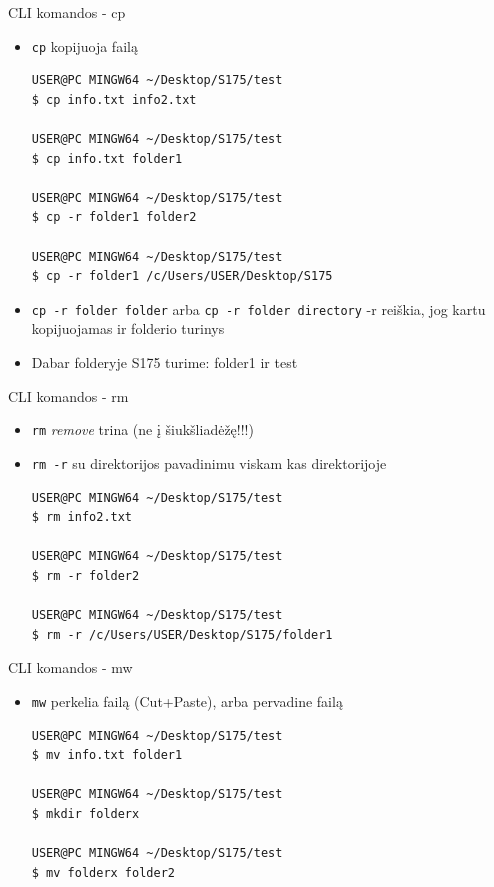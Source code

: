 \documentclass[11pt,xcolor=table]{beamer}
\begin{document}
\begin{frame}[fragile]{CLI komandos - cp}
\begin{itemize}
\item \colorbox{listinggray}{\lstinline|cp|}  kopijuoja failą
\begin{lstlisting}
USER@PC MINGW64 ~/Desktop/S175/test
$ cp info.txt info2.txt

USER@PC MINGW64 ~/Desktop/S175/test
$ cp info.txt folder1

USER@PC MINGW64 ~/Desktop/S175/test
$ cp -r folder1 folder2

USER@PC MINGW64 ~/Desktop/S175/test
$ cp -r folder1 /c/Users/USER/Desktop/S175

\end{lstlisting}
\item \colorbox{listinggray}{\lstinline|cp -r folder folder|} arba \colorbox{listinggray}{\lstinline|cp -r folder directory|} -r reiškia, jog kartu kopijuojamas ir folderio turinys
\item Dabar folderyje S175 turime: folder1 ir test

\end{itemize}
\end{frame}

\begin{frame}[fragile]{CLI komandos - rm}
\begin{itemize}
\item \colorbox{listinggray}{\lstinline|rm|} \textit{remove} trina (ne į šiukšliadėžę!!!)
\item \colorbox{listinggray}{\lstinline|rm -r|}  su direktorijos pavadinimu viskam kas direktorijoje
\begin{lstlisting}
USER@PC MINGW64 ~/Desktop/S175/test
$ rm info2.txt

USER@PC MINGW64 ~/Desktop/S175/test
$ rm -r folder2

USER@PC MINGW64 ~/Desktop/S175/test
$ rm -r /c/Users/USER/Desktop/S175/folder1
\end{lstlisting}
\end{itemize}
\end{frame}

\begin{frame}[fragile]{CLI komandos - mw}
\begin{itemize}
\item \colorbox{listinggray}{\lstinline|mw|} perkelia failą (Cut+Paste), arba pervadine failą
\begin{lstlisting}
USER@PC MINGW64 ~/Desktop/S175/test
$ mv info.txt folder1

USER@PC MINGW64 ~/Desktop/S175/test
$ mkdir folderx

USER@PC MINGW64 ~/Desktop/S175/test
$ mv folderx folder2
\end{lstlisting}
\end{itemize}
\end{frame}
\end{document}
